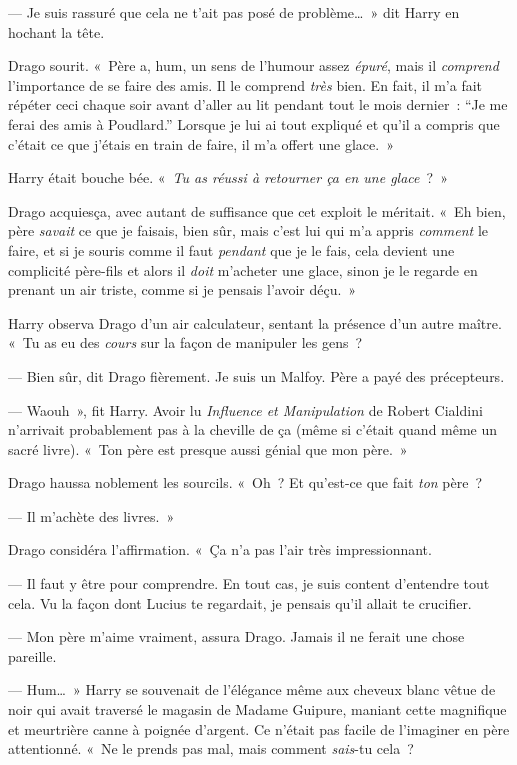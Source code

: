 --- Je suis rassuré que cela ne t'ait pas posé de problème…~» dit Harry en hochant la tête.

Drago sourit. «~Père a, hum, un sens de l'humour assez \emph{épuré}, mais il \emph{comprend} l'importance de se faire des amis.
Il le comprend \emph{très} bien.
En fait, il m'a fait répéter ceci chaque soir avant d'aller au lit pendant tout le mois dernier~: “Je me ferai des amis à Poudlard.”
Lorsque je lui ai tout expliqué et qu'il a compris que c'était ce que j'étais en train de faire, il m'a offert une glace.~»

Harry était bouche bée. «~\emph{Tu as réussi à retourner ça en une glace}~?~»

Drago acquiesça, avec autant de suffisance que cet exploit le méritait.
«~Eh bien, père \emph{savait} ce que je faisais, bien sûr, mais c'est lui qui m'a appris \emph{comment} le faire, et si je souris comme il faut \emph{pendant} que je le fais, cela devient une complicité père-fils et alors il \emph{doit} m'acheter une glace, sinon je le regarde en prenant un air triste, comme si je pensais l'avoir déçu.~»

Harry observa Drago d'un air calculateur, sentant la présence d'un autre maître.
«~Tu as eu des \emph{cours} sur la façon de manipuler les gens~?

--- Bien sûr, dit Drago fièrement. Je suis un Malfoy. Père a payé des précepteurs.

--- Waouh~», fit Harry. Avoir lu \emph{Influence et Manipulation} de Robert Cialdini n'arrivait probablement pas à la cheville de ça (même si c'était quand même un sacré livre).
«~Ton père est presque aussi génial que mon père.~»

Drago haussa noblement les sourcils.
«~Oh~? Et qu'est-ce que fait \emph{ton} père~?

--- Il m'achète des livres.~»

Drago considéra l'affirmation.  «~Ça n'a pas l'air très impressionnant.

--- Il faut y être pour comprendre.
En tout cas, je suis content d'entendre tout cela.
Vu la façon dont Lucius te regardait, je pensais qu'il allait te crucifier.

--- Mon père m'aime vraiment, assura Drago. Jamais il ne ferait une chose pareille.

--- Hum…~» Harry se souvenait
de l'élégance même aux cheveux blanc vêtue de noir qui avait traversé le magasin de Madame Guipure, maniant cette magnifique et meurtrière canne à poignée d'argent.
Ce n'était pas facile de l'imaginer en père attentionné.
«~Ne le prends pas mal, mais comment \emph{sais}-tu cela~?


